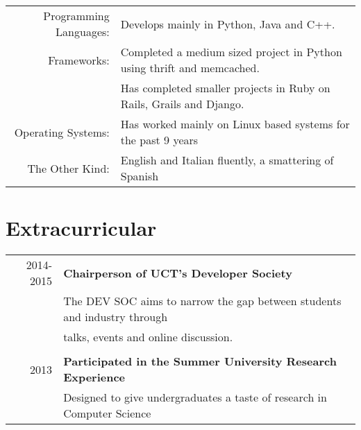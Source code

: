 \documentclass[a4paper,10pt]{article} %
\begin{document}
\begin{tabular}{rl}
Programming Languages:& Develops mainly in Python, Java and C++.\\
Frameworks:& Completed a medium sized project in Python using thrift and memcached. \\
& Has completed smaller projects in Ruby on Rails, Grails and Django. \\
Operating Systems: & Has worked mainly on Linux based systems for the past 9 years\\
The Other Kind: & English and Italian fluently, a smattering of Spanish\\
\end{tabular}

\section{Extracurricular}

\begin{tabular}{rl}



\textsc{2014-2015} & \textbf{Chairperson of UCT's Developer Society}\\
& The DEV SOC aims to narrow the gap between students and industry through\\
& talks, events and online discussion.\\
&\\
\textsc{2013} & \textbf{Participated in the Summer University Research Experience}\\
& Designed to give undergraduates a taste of research in Computer Science\\



\end{tabular}
\end{document}
